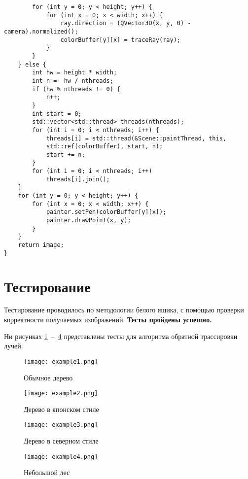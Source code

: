 \newpage

\begin{code}
\caption{Основная функция трассировки лучей (продолжение листинга \ref{code:prev})}
\label{code:end}
\begin{verbatim}
        for (int y = 0; y < height; y++) {
            for (int x = 0; x < width; x++) {
                ray.direction = (QVector3D(x, y, 0) - camera).normalized();
                colorBuffer[y][x] = traceRay(ray);
            }
        }
    } else {
        int hw = height * width;
        int n =  hw / nthreads;
        if (hw % nthreads != 0) {
            n++;
        }
        int start = 0;
        std::vector<std::thread> threads(nthreads);
        for (int i = 0; i < nthreads; i++) {
            threads[i] = std::thread(&Scene::paintThread, this, 
            std::ref(colorBuffer), start, n);
            start += n;
        }
        for (int i = 0; i < nthreads; i++)
            threads[i].join();
    }
    for (int y = 0; y < height; y++) {
        for (int x = 0; x < width; x++) {
            painter.setPen(colorBuffer[y][x]);
            painter.drawPoint(x, y);
        }
    }
    return image;
}
\end{verbatim}
\end{code}

\newpage

\section{Тестирование}
Тестирование проводилось по методологии белого ящика, с помощью проверки корректности получаемых изображений. \textbf{Тесты пройдены успешно.}

Ни рисунках \ref{img:example1}~--~\ref{img:example4} представлены тесты для алгоритма обратной трассировки лучей.

\noindent
\begin{figure}[h!]
	\centering
    \texttt{[image: example1.png]}
    \caption{Обычное дерево}
    \label{img:example1}
\end{figure}

\noindent
\begin{figure}[h!]
	\centering
    \texttt{[image: example2.png]}
    \caption{Дерево в японском стиле}
    \label{img:example2}
\end{figure}

\newpage 

\noindent
\begin{figure}[h!]
	\centering
    \texttt{[image: example3.png]}
    \caption{Дерево в северном стиле}
    \label{img:example3}
\end{figure}

\noindent
\begin{figure}[h!]
	\centering
    \texttt{[image: example4.png]}
    \caption{Небольшой лес}
    \label{img:example4}
\end{figure}


\newpage